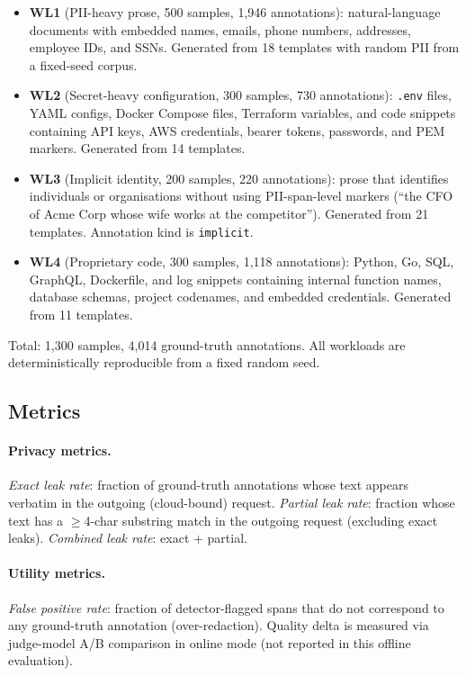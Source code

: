 \documentclass[11pt,a4paper]{article}
\begin{document}
\begin{itemize}
  \item \textbf{WL1} (PII-heavy prose, 500 samples, 1{,}946
    annotations): natural-language documents with embedded names,
    emails, phone numbers, addresses, employee IDs, and SSNs.
    Generated from 18 templates with random PII from a
    fixed-seed corpus.
  \item \textbf{WL2} (Secret-heavy configuration, 300 samples,
    730 annotations): \texttt{.env} files, YAML configs, Docker
    Compose files, Terraform variables, and code snippets
    containing API keys, AWS credentials, bearer tokens,
    passwords, and PEM markers.  Generated from 14 templates.
  \item \textbf{WL3} (Implicit identity, 200 samples, 220
    annotations): prose that identifies individuals or
    organisations without using PII-span-level markers (``the
    CFO of Acme Corp whose wife works at the competitor'').
    Generated from 21 templates.  Annotation kind is
    \texttt{implicit}.
  \item \textbf{WL4} (Proprietary code, 300 samples, 1{,}118
    annotations): Python, Go, SQL, GraphQL, Dockerfile, and
    log snippets containing internal function names, database
    schemas, project codenames, and embedded credentials.
    Generated from 11 templates.
\end{itemize}

Total: 1{,}300 samples, 4{,}014 ground-truth annotations.
All workloads are deterministically reproducible from a fixed
random seed.

\subsection{Metrics}

\paragraph{Privacy metrics.}
\emph{Exact leak rate}: fraction of ground-truth annotations
whose text appears verbatim in the outgoing (cloud-bound)
request.
\emph{Partial leak rate}: fraction whose text has a $\geq$4-char
substring match in the outgoing request (excluding exact leaks).
\emph{Combined leak rate}: exact + partial.

\paragraph{Utility metrics.}
\emph{False positive rate}: fraction of detector-flagged spans
that do not correspond to any ground-truth annotation
(over-redaction).  Quality delta is measured via judge-model A/B
comparison in online mode (not reported in this offline
evaluation).
\end{document}
